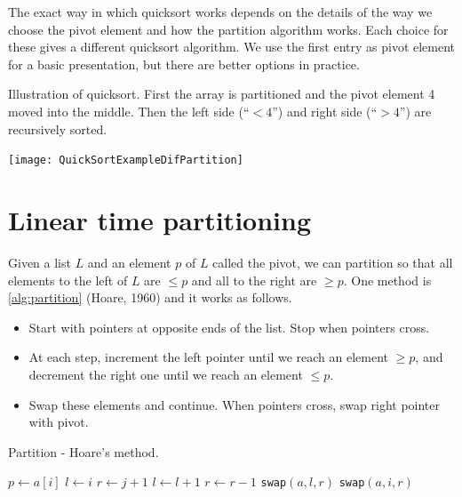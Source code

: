 The exact way in which quicksort works depends on the details of the way we choose the pivot element and how the 
partition algorithm works. Each choice for these gives a different quicksort algorithm.
We use the first entry as pivot element for a basic presentation, but there are better options in practice.

\begin{Boxample} \label{ex:quicksortSmall}
Illustration of quicksort. First the array is partitioned and the pivot element 4 moved into the middle. 
Then the left side (``$< 4$'') and right side (``$> 4$'') are recursively sorted.
\begin{center}
  \texttt{[image: QuickSortExampleDifPartition]}
\end{center}
\end{Boxample}


\section{Linear time partitioning}
Given a list $L$ and an element $p$ of $L$ called the pivot, we can partition so
 that all elements to the left of $L$ are $\leq p$ and all to the right are 
$\geq p$. One method is \cref{alg:partition} (Hoare, 1960) and it works as follows.
\begin{itemize}
\item Start with pointers at opposite ends of the list. Stop when pointers cross.
\item At each step, increment the left pointer until we reach an element $\geq p$, and decrement the right one until we reach an element $\leq p$. 
\item Swap these elements and continue. When pointers cross, swap right pointer with pivot.
\end{itemize}

\begin{algorithm}[H]
  \caption{Partition - Hoare's method.}
    \label{alg:partition}
\begin{algorithmic}[0]
	\State $p \gets a[i]$ 
	\State $l \gets i $ 
	\State $r \gets j+1$ 
		\Repeat
			\State $l \gets l+1$ 
		\Repeat
			\State $r \gets r-1$ 
			\State \texttt{swap}$(a,l,r)$  
		\Else
			\State \texttt{swap}$(a,i,r)$  
			\State {}
		\EndIf
	\EndWhile
\EndFunction  
\end{algorithmic}
\end{algorithm}


